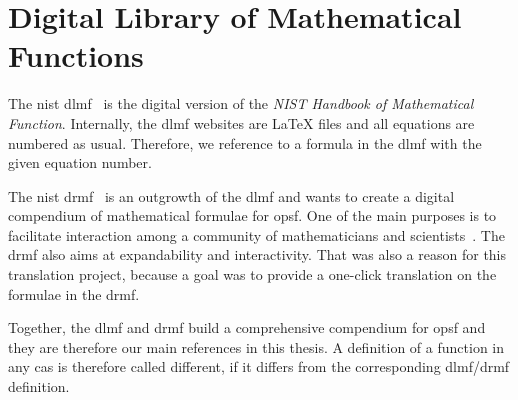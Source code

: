 \section{Digital Library of Mathematical Functions}\label{sec:dlmf}
The \gls{nist} \gls{dlmf}~\cite{NIST:DLMF:Paper} is the digital version of the \textit{NIST Handbook of Mathematical Function}. Internally, the \gls{dlmf} websites are \LaTeX{} files and all equations are numbered as usual. Therefore, we reference to a formula in the \gls{dlmf} with the given equation number.

The \gls{nist} \gls{drmf}~\cite{DRMF:14} is an outgrowth of the \gls{dlmf} and wants to create a digital compendium of mathematical formulae for \gls{opsf}. One of the main purposes is to facilitate interaction among a community of mathematicians and scientists~\cite{DRMF:15}. The \gls{drmf} also aims at expandability and interactivity. That was also a reason for this translation project, because a goal was to provide a one-click translation on the formulae in the \gls{drmf}.

Together, the \gls{dlmf} and \gls{drmf} build a comprehensive compendium for \gls{opsf} and they are therefore our main references in this thesis. A definition of a function in any \gls{cas} is therefore called different, if it differs from the corresponding \gls{dlmf}/\gls{drmf} definition.